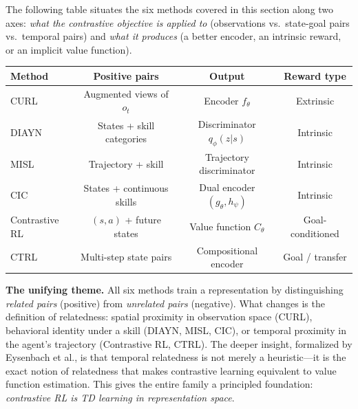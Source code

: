 \documentclass[11pt, letterpaper]{article}
\begin{document}
\begin{remark}
    The following table situates the six methods covered in this section along two axes: \textit{what the contrastive objective is applied to} (observations vs.\ state-goal pairs vs.\ temporal pairs) and \textit{what it produces} (a better encoder, an intrinsic reward, or an implicit value function).
 
    \begin{center}
    \begin{tabular}{lccc}
        \textbf{Method} & \textbf{Positive pairs} & \textbf{Output} & \textbf{Reward type} \\
        \hline
        CURL & Augmented views of \(o_t\) & Encoder \(f_\theta\) & Extrinsic \\
        DIAYN & States + skill categories & Discriminator \(q_\phi(z|s)\) & Intrinsic \\
        MISL & Trajectory + skill & Trajectory discriminator & Intrinsic \\
        CIC & States + continuous skills & Dual encoder \((g_\theta, h_\psi)\) & Intrinsic \\
        Contrastive RL & \((s,a)\) + future states & Value function \(C_\theta\) & Goal-conditioned \\
        CTRL & Multi-step state pairs & Compositional encoder & Goal / transfer \\
    \end{tabular}
    \end{center}
 
    \textbf{The unifying theme.} All six methods train a representation by distinguishing \textit{related pairs} (positive) from \textit{unrelated pairs} (negative). What changes is the definition of relatedness: spatial proximity in observation space (CURL), behavioral identity under a skill (DIAYN, MISL, CIC), or temporal proximity in the agent's trajectory (Contrastive RL, CTRL). The deeper insight, formalized by Eysenbach et al., is that temporal relatedness is not merely a heuristic---it is the exact notion of relatedness that makes contrastive learning equivalent to value function estimation. This gives the entire family a principled foundation: \textit{contrastive RL is TD learning in representation space}.
\end{remark}
 
\end{document}
